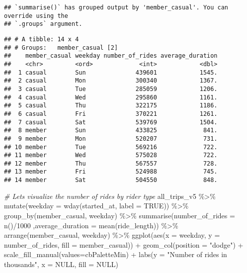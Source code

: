 \documentclass[
]{article}
\newenvironment{Shaded}{\begin{snugshade}}{\end{snugshade}}
\newcommand{\AttributeTok}[1]{\textcolor[rgb]{0.77,0.63,0.00}{#1}}
\newcommand{\CommentTok}[1]{\textcolor[rgb]{0.56,0.35,0.01}{\textit{#1}}}
\newcommand{\ConstantTok}[1]{\textcolor[rgb]{0.00,0.00,0.00}{#1}}
\newcommand{\DecValTok}[1]{\textcolor[rgb]{0.00,0.00,0.81}{#1}}
\newcommand{\FunctionTok}[1]{\textcolor[rgb]{0.00,0.00,0.00}{#1}}
\newcommand{\NormalTok}[1]{#1}
\newcommand{\SpecialCharTok}[1]{\textcolor[rgb]{0.00,0.00,0.00}{#1}}
\newcommand{\StringTok}[1]{\textcolor[rgb]{0.31,0.60,0.02}{#1}}
\begin{document}
\begin{verbatim}
## `summarise()` has grouped output by 'member_casual'. You can override using the
## `.groups` argument.
\end{verbatim}

\begin{verbatim}
## # A tibble: 14 x 4
## # Groups:   member_casual [2]
##    member_casual weekday number_of_rides average_duration
##    <chr>         <ord>             <int>            <dbl>
##  1 casual        Sun              439601            1545.
##  2 casual        Mon              300340            1367.
##  3 casual        Tue              285059            1206.
##  4 casual        Wed              295860            1161.
##  5 casual        Thu              322175            1186.
##  6 casual        Fri              370221            1261.
##  7 casual        Sat              539769            1504.
##  8 member        Sun              433825             841.
##  9 member        Mon              520207             731.
## 10 member        Tue              569216             722.
## 11 member        Wed              575028             722.
## 12 member        Thu              567557             728.
## 13 member        Fri              524988             745.
## 14 member        Sat              504550             848.
\end{verbatim}

\begin{Shaded}
\begin{Highlighting}[]
\CommentTok{\# Let\textquotesingle{}s visualize the number of rides by rider type}
\NormalTok{all\_trips\_v5 }\SpecialCharTok{\%\textgreater{}\%} 
  \FunctionTok{mutate}\NormalTok{(}\AttributeTok{weekday =} \FunctionTok{wday}\NormalTok{(started\_at, }\AttributeTok{label =} \ConstantTok{TRUE}\NormalTok{)) }\SpecialCharTok{\%\textgreater{}\%} 
  \FunctionTok{group\_by}\NormalTok{(member\_casual, weekday) }\SpecialCharTok{\%\textgreater{}\%} 
  \FunctionTok{summarise}\NormalTok{(}\AttributeTok{number\_of\_rides =} \FunctionTok{n}\NormalTok{()}\SpecialCharTok{/}\DecValTok{1000}
\NormalTok{            ,}\AttributeTok{average\_duration =} \FunctionTok{mean}\NormalTok{(ride\_length)) }\SpecialCharTok{\%\textgreater{}\%} 
  \FunctionTok{arrange}\NormalTok{(member\_casual, weekday)  }\SpecialCharTok{\%\textgreater{}\%} 
  \FunctionTok{ggplot}\NormalTok{(}\FunctionTok{aes}\NormalTok{(}\AttributeTok{x =}\NormalTok{ weekday, }\AttributeTok{y =}\NormalTok{ number\_of\_rides, }\AttributeTok{fill =}\NormalTok{ member\_casual)) }\SpecialCharTok{+}
  \FunctionTok{geom\_col}\NormalTok{(}\AttributeTok{position =} \StringTok{"dodge"}\NormalTok{) }\SpecialCharTok{+} 
  \FunctionTok{scale\_fill\_manual}\NormalTok{(}\AttributeTok{values=}\NormalTok{cbPaletteMin) }\SpecialCharTok{+}
  \FunctionTok{labs}\NormalTok{(}\AttributeTok{y =} \StringTok{"Number of rides in thousands"}\NormalTok{, }\AttributeTok{x =} \ConstantTok{NULL}\NormalTok{, }\AttributeTok{fill =} \ConstantTok{NULL}\NormalTok{)}
\end{Highlighting}
\end{Shaded}
\end{document}
